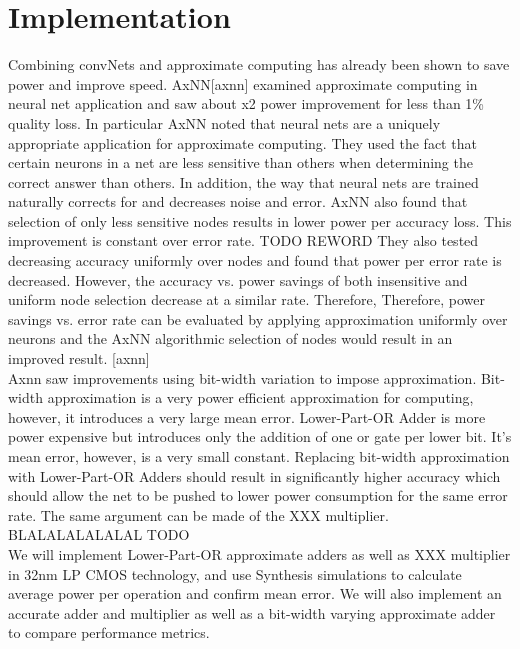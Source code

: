 \documentclass[journal]{IEEEtran}
\begin{document}
\section{Implementation}
	\indent Combining convNets and approximate computing has already been shown to save power and improve speed. AxNN[axnn] examined approximate computing in neural net application and saw about x2 power improvement for less than 1\% quality loss. In particular AxNN noted that neural nets are a uniquely appropriate application for approximate computing. They used the fact that certain neurons in a net are less sensitive than others when determining the correct answer than others. In addition, the way that neural nets are trained naturally corrects for and decreases noise and error. AxNN also found that selection of only less sensitive nodes results in lower power per accuracy loss. This improvement is constant over error rate. TODO REWORD
They also tested decreasing accuracy uniformly over nodes and found that power per error rate is decreased. However, the accuracy vs. power savings of both insensitive and uniform node selection decrease at a similar rate. Therefore, 
Therefore, power savings vs. error rate can be evaluated by applying approximation uniformly over neurons and the AxNN algorithmic selection of nodes would result in an improved result. [axnn] \\ 


	\indent Axnn saw improvements using bit-width variation to impose approximation. Bit-width approximation is a very power efficient approximation for computing, however, it introduces a very large mean error. Lower-Part-OR Adder is more power expensive but introduces only the addition of one or gate per lower bit. It's mean error, however, is a very small constant. Replacing bit-width approximation with Lower-Part-OR Adders should result in significantly higher accuracy which should allow the net to be pushed to lower power consumption for the same error rate. The same argument can be made of the XXX multiplier. BLALALALALALAL TODO\\

	\indent We will implement Lower-Part-OR approximate adders as well as XXX multiplier in 32nm LP CMOS technology, and use Synthesis simulations to calculate average power per operation and confirm mean error. We will also implement an accurate adder and multiplier as well as a  bit-width varying approximate adder to compare performance metrics.\\
\end{document}
